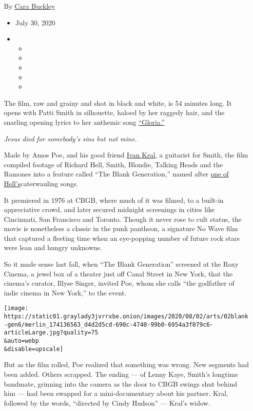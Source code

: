 By \href{https://www.nytimes3xbfgragh.onion/by/cara-buckley}{Cara
Buckley}

\begin{itemize}
\item
  July 30, 2020
\item
  \begin{itemize}
  \item
  \item
  \item
  \item
  \item
  \end{itemize}
\end{itemize}

The film, raw and grainy and shot in black and white, is 54 minutes
long. It opens with Patti Smith in silhouette, haloed by her raggedy
hair, and the snarling opening lyrics to her anthemic song
\href{https://www.youtube.com/watch?v=j7sodwiQJ6c}{``Gloria.''}

\emph{Jesus died for somebody's sins but not mine.}

Made by Amos Poe, and his good friend
\href{https://www.nytimes3xbfgragh.onion/2020/02/05/arts/music/ivan-kral-dead.html}{Ivan
Kral}, a guitarist for Smith, the film compiled footage of Richard Hell,
Smith, Blondie, Talking Heads and the Ramones into a feature called
``The Blank Generation,'' named after
\href{https://www.youtube.com/watch?v=JsK8fHPjav0}{one of
Hell's}caterwauling songs.

It premiered in 1976 at CBGB, where much of it was filmed, to a built-in
appreciative crowd, and later secured midnight screenings in cities like
Cincinnati, San Francisco and Toronto. Though it never rose to cult
status, the movie is nonetheless a classic in the punk pantheon, a
signature No Wave film that captured a fleeting time when an eye-popping
number of future rock stars were lean and hungry unknowns.

So it made sense last fall, when ``The Blank Generation'' screened at
the Roxy Cinema, a jewel box of a theater just off Canal Street in New
York, that the cinema's curator, Illyse Singer, invited Poe, whom she
calls ``the godfather of indie cinema in New York,'' to the event.

\texttt{[image: https://static01.graylady3jvrrxbe.onion/images/2020/08/02/arts/02blank-gen6/merlin\_174136563\_d4d2d5cd-690c-4740-99b0-6954a3f079c6-articleLarge.jpg?quality=75\\\&auto=webp\\\&disable=upscale]}

But as the film rolled, Poe realized that something was wrong. New
segments had been added. Others scrapped. The ending --- of Lenny Kaye,
Smith's longtime bandmate, grinning into the camera as the door to CBGB
swings shut behind him --- had been swapped for a mini-documentary about
his partner, Kral, followed by the words, ``directed by Cindy Hudson''
--- Kral's widow.

